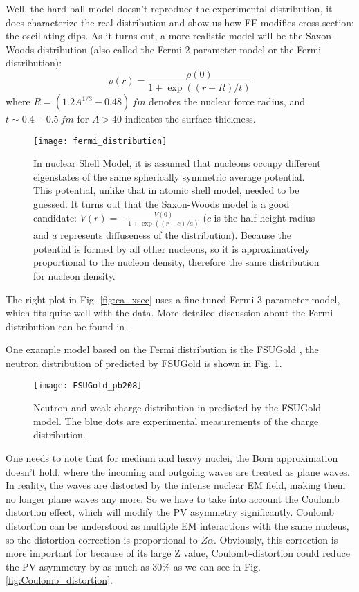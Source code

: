 Well, the hard ball model doesn't reproduce the experimental distribution, it does
characterize the real distribution and show us how FF modifies cross section:
the oscillating dips. As it turns out, a more realistic model will be the
Saxon-Woods distribution (also called the Fermi 2-parameter model or the Fermi
distribution):
\begin{equation}
    \rho(r) = \frac{\rho(0)}{1 + \exp((r-R)/t)}
\end{equation}
where $R = (1.2A^{1/3} - 0.48) \ fm$ denotes the nuclear force radius, 
and $t \sim 0.4-0.5 \ fm$ for  $A > 40$ indicates the surface thickness.
\begin{figure}
    \centering
    \texttt{[image: fermi\_distribution]}
    \caption{In nuclear Shell Model, it is assumed that nucleons occupy 
    different eigenstates of the same spherically symmetric average potential.
    This potential, unlike that in atomic shell model, needed to be guessed. 
    It turns out that the Saxon-Woods model is a good candidate: 
    $V(r) = -\frac{V(0)}{1+\exp((r-c)/a)}$ ($c$ is the half-height radius and $a$ represents
    diffuseness of the distribution). Because the potential is formed
    by all other nucleons, so it is approximatively proportional to the nucleon density, 
    therefore the same distribution for nucleon density.} 
\end{figure}

The right plot in Fig. \ref{fig:ca_xsec} uses a fine tuned Fermi 3-parameter model,
which fits quite well with the data. More detailed discussion about the Fermi 
distribution can be found in \cite{Maximon:1966sqn}.

One example model based on the Fermi distribution is the FSUGold \cite{PhysRevLett.95.122501},
the neutron distribution of \Pb predicted by FSUGold is shown in Fig. \ref{fig:FSUGold_pb208}.
\begin{figure}
    \centering
    \texttt{[image: FSUGold\_pb208]}
    \caption{Neutron and weak charge distribution in \Pb predicted by the FSUGold model.
    The blue dots are experimental measurements of the charge distribution.}
    \label{fig:FSUGold_pb208}
\end{figure}

One needs to note that for medium and heavy nuclei, the Born approximation
doesn't hold, where the incoming and outgoing waves are treated as plane waves.
In reality, the waves are distorted by the intense nuclear EM field, making them
no longer plane waves any more. So we have to take into account the 
Coulomb distortion effect, which will modify the PV asymmetry significantly.
Coulomb distortion can be understood as multiple EM interactions with
the same nucleus, so the distortion correction is proportional to $Z\alpha$. 
Obviously, this correction is more important for \Pb because of its large Z value,
Coulomb-distortion could reduce the PV asymmetry by as much as 30\% as we can see
in Fig. \ref{fig:Coulomb_distortion}.

